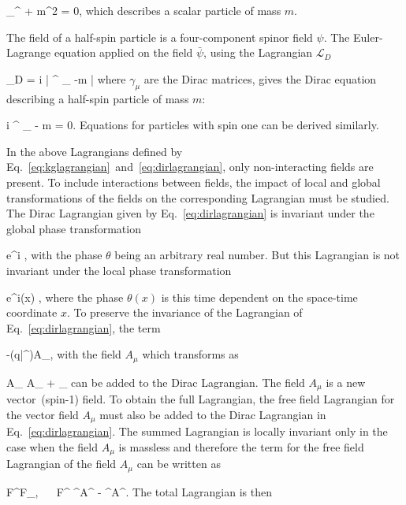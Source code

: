 {
 \partial_{\mu}\partial^{\mu} \phi + m^{2} \phi = 0,
}
which describes a scalar particle of mass $m$. 

The field of a half-spin particle is a four-component spinor field $\psi$. The Euler-Lagrange equation applied on the field $\bar{\psi}$, using the Lagrangian $\mathcal{L}_{D}$


{
 _{D} = i \bar{\psi} \gamma^{\mu} \partial_{\mu} \psi -m \bar{\psi} \psi
}
where $\gamma_{\mu}$ are the Dirac matrices, gives the Dirac equation describing a half-spin particle of mass $m$:

{
  i \gamma^{\mu} \partial_{\mu} \psi - m \psi = 0.
}
Equations for particles with spin one can be derived similarly.

In the above Lagrangians defined by Eq.~\ref{eq:kglagrangian}~and~\ref{eq:dirlagrangian}, only non-interacting fields are present. To include interactions between fields, the impact of local and global transformations of the fields on the corresponding Lagrangian must be studied. The Dirac Lagrangian given by Eq.~\ref{eq:dirlagrangian} is invariant under the global phase transformation

{
\psi \to e^{i\theta} \psi, 
}
with the phase $\theta$ being an arbitrary real number. But this Lagrangian is not invariant under the local phase transformation 

{
\psi \to e^{i\theta (x)} \psi,
}
where the phase $\theta(x)$ is this time dependent on the space-time coordinate $x$. To preserve the invariance of the Lagrangian of Eq.~\ref{eq:dirlagrangian}, the term 

{
-(q\bar{\psi}\gamma^{\mu}\psi)A_{\mu}, 
}
with the field $A_{\mu}$ which transforms as 

{
A_{\mu} \to A_{\mu} + \partial_{\mu} \lambda
}
can be added to the Dirac Lagrangian. The field $A_{\mu}$ is a new vector~(spin-1) field. To obtain the full Lagrangian, the free field Lagrangian for the vector field $A_{\mu}$ must also be added to the Dirac Lagrangian in Eq.~\ref{eq:dirlagrangian}. The summed Lagrangian is locally invariant only in the case when the field $A_{\mu}$ is massless and therefore the term for the free field Lagrangian of the field $A_{\mu}$ can be written as

{
    F^{\mu\nu}F_{\mu\nu}, ~~ F^{\mu\nu} \equiv \partial^{\mu}A^{\nu} - \partial^{\nu}A^{\mu}.
} 
The total Lagrangian is then

